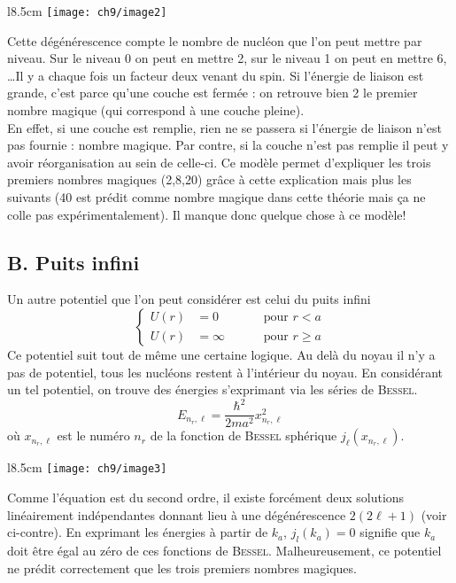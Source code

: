 	\begin{wrapfigure}[9]{l}{8.5cm}
	\vspace{-5mm}
	\texttt{[image: ch9/image2]}
	\end{wrapfigure}

Cette dégénérescence compte le nombre de nucléon que l'on peut mettre par niveau. Sur le niveau 0 on peut en
mettre 2, sur le niveau 1 on peut en mettre 6, \dots Il y a chaque fois un facteur deux venant du spin. Si
l'énergie de liaison est grande, c'est parce qu'une couche est fermée : on retrouve bien 2 le premier nombre 
magique (qui correspond à une couche pleine). \\

En effet, si une couche est remplie, rien ne se passera si l'énergie de liaison n'est pas fournie : nombre 
magique. Par contre, si la couche n'est pas remplie il peut y avoir réorganisation au sein de celle-ci. Ce 
modèle permet d'expliquer les trois premiers nombres magiques (2,8,20) grâce à cette explication mais plus les
suivants (40 est prédit comme nombre magique dans cette théorie mais ça ne colle pas expérimentalement). Il 
manque donc quelque chose à ce modèle!

\subsection{B. Puits infini}
Un autre potentiel que l'on peut considérer est celui du puits infini
\begin{equation}
\left\{\begin{array}{lll}
U(r) &= 0&\qquad\text{ pour } r< a\\
U(r) &= \infty&\qquad\text{ pour } r\geq a
\end{array}\right.
\end{equation}
Ce potentiel suit tout de même une certaine logique. Au delà du noyau il n'y a pas de potentiel, tous les 
nucléons restent à l'intérieur du noyau. En considérant un tel potentiel, on trouve des énergies s'exprimant
via les séries de \textsc{Bessel}. 
\begin{equation}
E_{n_r,\ell} = \frac{\hbar^2}{2ma^2}x^2_{n_r,\ell}
\end{equation}
où $x_{n_r,\ell}$ est le numéro $n_r$ de la fonction de \textsc{Bessel} sphérique $j_\ell(x_{n_r,\ell})$. \\

	\begin{wrapfigure}[10]{l}{8.5cm}
	\vspace{-5mm}
	\texttt{[image: ch9/image3]}
	\end{wrapfigure}
Comme l'équation est du second ordre, il existe forcément deux solutions linéairement indépendantes donnant lieu à
une dégénérescence $2(2\ell +1)$ (voir ci-contre). En exprimant les énergies à partir de $k_a$, $j_l(k_a)=0$ 
signifie que $k_a$ doit être égal au zéro de ces fonctions de \textsc{Bessel}. Malheureusement, ce potentiel
ne prédit correctement que les trois premiers nombres magiques.



